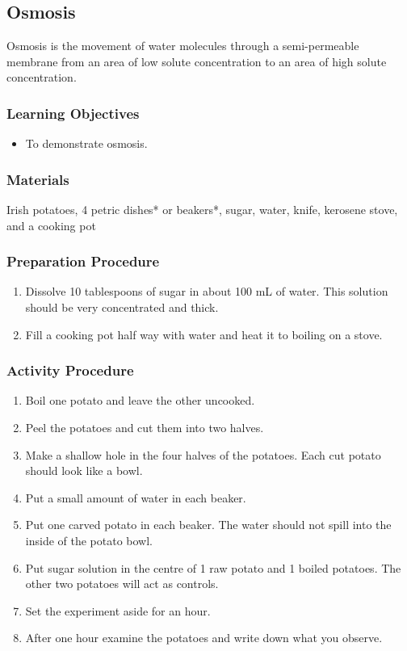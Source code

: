 \subsection{Osmosis}

Osmosis is the movement of water molecules through a semi-permeable membrane from an area of low solute concentration to an area of high solute concentration.

\subsubsection*{Learning Objectives}
\begin{itemize}
\item{To demonstrate osmosis.}
\end{itemize}

\subsubsection*{Materials}
Irish potatoes, 4 petric dishes* or beakers*, sugar, water, knife, kerosene stove, and a cooking pot

\subsubsection*{Preparation Procedure}
\begin{enumerate}
\item{Dissolve 10 tablespoons of sugar in about 100 mL of water. This solution should be very concentrated and thick.}
\item{Fill a cooking pot half way with water and heat it to boiling on a stove.}
\end{enumerate}

\subsubsection*{Activity Procedure}
\begin{enumerate}
\item{Boil one potato and leave the other uncooked.}
\item{Peel the potatoes and cut them into two halves.}
\item{Make a shallow hole in the four halves of the potatoes. Each cut potato should look like a bowl.}
\item{Put a small amount of water in each beaker.}
\item{Put one carved potato in each beaker. The water should not spill into the inside of the potato bowl.}
\item{Put sugar solution in the centre of 1 raw potato and 1 boiled potatoes. The other two potatoes will act as controls.}
\item{Set the experiment aside for an hour.}
\item{After one hour examine the potatoes and write down what you observe.}
\end{enumerate}

